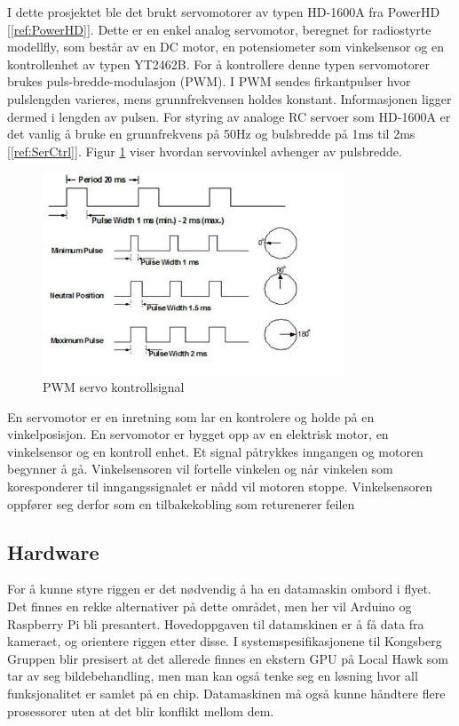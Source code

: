I dette prosjektet ble det brukt servomotorer av typen HD-1600A fra PowerHD [\ref{ref:PowerHD}]. Dette er en enkel analog servomotor, beregnet for radiostyrte modellfly, som består av en DC motor, en potensiometer som vinkelsensor og en kontrollenhet av typen YT2462B. For å kontrollere denne typen servomotorer brukes puls-bredde-modulasjon (PWM). I PWM sendes firkantpulser hvor pulslengden varieres, mens grunnfrekvensen holdes konstant. Informasjonen ligger dermed i lengden av pulsen. For styring av analoge RC servoer som HD-1600A er det vanlig å bruke en grunnfrekvens på 50Hz og bulsbredde på 1ms til 2ms [\ref{ref:SerCtrl}]. Figur \ref{fig:PWM} viser hvordan servovinkel avhenger av pulsbredde.

\begin{figure}[H]
\centering
\includegraphics[width=0.8\textwidth]{img/pwm_servo.jpg}
\caption{PWM servo kontrollsignal}
\label{fig:PWM}
\end{figure}

En servomotor er en inretning som lar en kontrolere og holde på en vinkelposisjon.
En servomotor er bygget opp av en elektrisk motor,
en vinkelsensor og en kontroll enhet.
Et signal påtrykkes inngangen og motoren begynner å gå.
Vinkelsensoren vil fortelle vinkelen og når vinkelen som koresponderer
til inngangssignalet er nådd vil motoren stoppe.
Vinkelsensoren oppfører seg derfor som en tilbakekobling som returenerer feilen

\subsection{Hardware}
For å kunne styre riggen er det nødvendig å ha en datamaskin ombord i flyet. Det finnes en rekke alternativer på dette området, men her vil Arduino og Raspberry Pi bli presantert. Hovedoppgaven til datamskinen er å få data fra kameraet, og orientere riggen etter disse. I systemspesifikasjonene til Kongsberg Gruppen blir presisert at det allerede finnes en ekstern GPU på Local Hawk som tar av seg bildebehandling, men man kan også tenke seg en løsning hvor all funksjonalitet er samlet på en chip. Datamaskinen må også kunne håndtere flere prosessorer uten at det blir konflikt mellom dem. 

